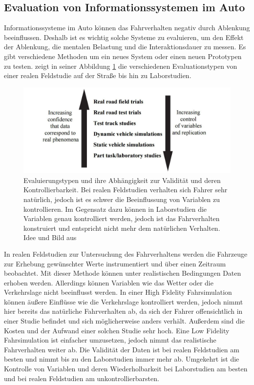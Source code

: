 \subsection[Evaluation von IVIS]{Evaluation von Informationssystemen im Auto}
Informationssysteme im Auto können das Fahrverhalten negativ durch Ablenkung beeinflussen. 
Deshalb ist es wichtig solche Systeme zu evaluieren, um den Effekt der Ablenkung, die mentalen Belastung und die Interaktionsdauer zu messen. 
Es gibt verschiedene Methoden um ein neues System oder einen neuen Prototypen zu testen. 
\citet{burnett2008designing} zeigt in seiner Abbildung \ref{fig:Evaluation_of_in_car_computing_devices_Burnett2008} die verschiedenen Evaluationstypen von einer realen Feldstudie auf der Straße bis hin zu Laborstudien. 
\begin{figure}
	\centering
		\includegraphics[width=1\textwidth]{img/Evaluation_of_in_car_computing_devices_Burnett2008.jpg}
	\caption[Evaluierungstypen und ihre Abhängigkeit zu Validität und deren Kontrollierbarkeit]{
Evaluierungstypen und ihre Abhängigkeit zur Validität und deren Kontrollierbarkeit. 
Bei realen Feldstudien verhalten sich Fahrer sehr natürlich, jedoch ist es schwer die Beeinflussung von Variablen zu kontrollieren. 
Im Gegensatz dazu können in Laborstudien die Variablen genau kontrolliert werden, jedoch ist das Fahrverhalten konstruiert und entspricht nicht mehr dem natürlichen Verhalten. 
Idee und Bild aus \citet{burnett2008designing}}
	\label{fig:Evaluation_of_in_car_computing_devices_Burnett2008}
\end{figure}

In realen Feldstudien zur Untersuchung des Fahrverhaltens werden die Fahrzeuge zur Erhebung gewünschter Werte instrumentiert und über einen Zeitraum beobachtet. 
Mit dieser Methode können unter realistischen Bedingungen Daten erhoben werden. 
Allerdings können Variablen wie das Wetter oder die Verkehrslage nicht beeinflusst werden. 
In einer High Fidelity Fahrsimulation können äußere Einflüsse wie die Verkehrslage kontrolliert werden, jedoch nimmt hier bereits das natürliche Fahrverhalten ab, da sich der Fahrer offensichtlich in einer Studie befindet und sich möglicherweise anders verhält. 
Außerdem sind die Kosten und der Aufwand einer solchen Studie sehr hoch. 
Eine Low Fidelity Fahrsimulation ist einfacher umzusetzen, jedoch nimmt das realistische Fahrverhalten weiter ab. 
Die Validität der Daten ist bei realen Feldstudien am besten und nimmt bis zu den Laborstudien immer mehr ab. 
Umgekehrt ist die Kontrolle von Variablen und deren Wiederholbarkeit bei Laborstudien am besten und bei realen Feldstudien am unkontrollierbarsten.

